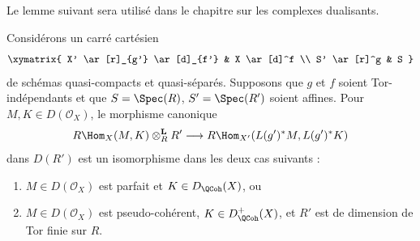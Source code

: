 \noindent
Le lemme suivant sera utilisé dans le chapitre sur les complexes dualisants.

\begin{lemma}
\label{lemma-affine-morphism-and-hom-out-of-perfect}
Considérons un carré cartésien
$$
\xymatrix{
X' \ar[r]_{g'} \ar[d]_{f'} & X \ar[d]^f \\
S' \ar[r]^g & S
}
$$
de schémas quasi-compacts et quasi-séparés. Supposons que $g$ et $f$ soient
Tor-indépendants et que $S = \Spec(R)$, $S' = \Spec(R')$ soient affines. Pour
$M, K \in D(\mathcal{O}_X)$, le morphisme canonique
$$
R\Hom_X(M, K) \otimes^\mathbf{L}_R R'
\longrightarrow
R\Hom_{X'}(L(g')^*M, L(g')^*K)
$$
dans $D(R')$ est un isomorphisme dans les deux cas suivants :
\begin{enumerate}
\item $M \in D(\mathcal{O}_X)$ est parfait et $K \in D_\QCoh(X)$, ou
\item $M \in D(\mathcal{O}_X)$ est pseudo-cohérent,
$K \in D_\QCoh^+(X)$, et $R'$ est de dimension de Tor finie sur $R$.
\end{enumerate}
\end{lemma}

